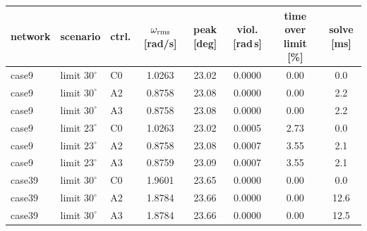 \begin{tabular}{lllccccc}
\toprule
network & scenario & ctrl. & $\omega_{\rm rms}$ [rad/s] & peak [deg] & viol. [rad\,s] & time over limit [\%] & solve [ms]\\
\midrule
case9 & limit $30^\circ$ & C0 & 1.0263 & 23.02 & 0.0000 & 0.00 & 0.0 \\
case9 & limit $30^\circ$ & A2 & 0.8758 & 23.08 & 0.0000 & 0.00 & 2.2 \\
case9 & limit $30^\circ$ & A3 & 0.8758 & 23.08 & 0.0000 & 0.00 & 2.2 \\
case9 & limit $23^\circ$ & C0 & 1.0263 & 23.02 & 0.0005 & 2.73 & 0.0 \\
case9 & limit $23^\circ$ & A2 & 0.8758 & 23.08 & 0.0007 & 3.55 & 2.1 \\
case9 & limit $23^\circ$ & A3 & 0.8759 & 23.09 & 0.0007 & 3.55 & 2.1 \\
\midrule
case39 & limit $30^\circ$ & C0 & 1.9601 & 23.65 & 0.0000 & 0.00 & 0.0 \\
case39 & limit $30^\circ$ & A2 & 1.8784 & 23.66 & 0.0000 & 0.00 & 12.6 \\
case39 & limit $30^\circ$ & A3 & 1.8784 & 23.66 & 0.0000 & 0.00 & 12.5 \\
\bottomrule
\end{tabular}
